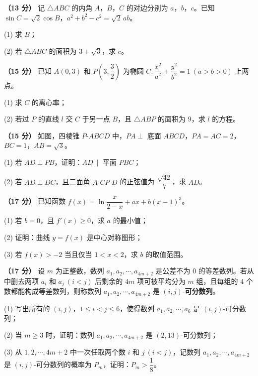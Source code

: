 \begin{question}
\textbf{（13 分）} 记 $\triangle ABC$ 的内角 $A$，$B$，$C$ 的对边分别为 $a$，$b$，$c$。已知 $\sin C=\sqrt2\cos B$，$a^{2}+b^{2}-c^{2}=\sqrt2\,ab$。

  (1) 求 $B$；

  (2) 若 $\triangle ABC$ 的面积为 $3+\sqrt3$，求 $c$。

\end{question}
\begin{question}
\textbf{（15 分）} 已知 $A(0,3)$ 和 $P\left(3,\dfrac32\right)$ 为椭圆 $C:\dfrac{x^{2}}{a^{2}}+\dfrac{y^{2}}{b^{2}}=1\ (a>b>0)$ 上两点。

  (1) 求 $C$ 的离心率；

  (2) 若过 $P$ 的直线 $l$ 交 $C$ 于另一点 $B$，且 $\triangle ABP$ 的面积为 $9$，求 $l$ 的方程。

\Needspace{0.4\textheight}
\end{question}
\begin{question}
\textbf{（15 分）} 如图，四棱锥 $P\text{-}ABCD$ 中，$PA\perp$ 底面 $ABCD$，$PA=AC=2$，$BC=1$，$AB=\sqrt3$。
\nopagebreak[4]
\begin{center}\end{center}
\nopagebreak[4]
  (1) 若 $AD\perp PB$，证明：$AD\parallel$ 平面 $PBC$；

  (2) 若 $AD\perp DC$，且二面角 $A\text{-}CP\text{-}D$ 的正弦值为 $\dfrac{\sqrt{42}}{7}$，求 $AD$。

\end{question}
\begin{question}
\textbf{（17 分）} 已知函数 $f(x)=\ln\dfrac{x}{2-x}+ax+b(x-1)^{3}$。

  (1) 若 $b=0$，且 $f'(x)\ge0$，求 $a$ 的最小值；

  (2) 证明：曲线 $y=f(x)$ 是中心对称图形；

  (3) 若 $f(x)>-2$ 当且仅当 $1<x<2$，求 $b$ 的取值范围。

\end{question}
\begin{question}
\textbf{（17 分）} 设 $m$ 为正整数，数列 $a_1,a_2,\cdots,a_{4m+2}$ 是公差不为 $0$ 的等差数列。若从中删去两项 $a_i$ 和 $a_j\ (i<j)$ 后剩余的 $4m$ 项可被平均分为 $m$ 组，且每组的 $4$ 个数都能构成等差数列，则称数列 $a_1,a_2,\cdots,a_{4m+2}$ 是 $(i,j)$-\textbf{可分数列}。

  (1) 写出所有的 $(i,j)$，$1\le i<j\le6$，使得数列 $a_1,a_2,\cdots,a_6$ 是 $(i,j)$-可分数列；

  (2) 当 $m\ge3$ 时，证明：数列 $a_1,a_2,\cdots,a_{4m+2}$ 是 $(2,13)$-可分数列；

  (3) 从 $1,2,\cdots,4m+2$ 中一次任取两个数 $i$ 和 $j\ (i<j)$，记数列 $a_1,a_2,\cdots,a_{4m+2}$ 是 $(i,j)$-可分数列的概率为 $P_m$，证明：$P_m>\dfrac18$。

\par\medskip


\end{question}